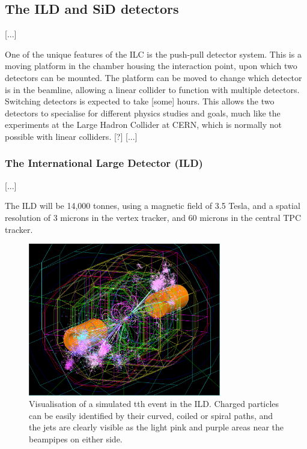 \subsection{The ILD and SiD detectors}
[...]

One of the unique features of the ILC is the push-pull detector system. This is a moving platform in the chamber housing the interaction point, upon which two detectors can be mounted. The platform can be moved to change which detector is in the beamline, allowing a linear collider to function with multiple detectors. Switching detectors is expected to take [some] hours. This allows the two detectors to specialise for different physics studies and goals, much like the experiments at the Large Hadron Collider at CERN, which is normally not possible with linear colliders. [?] [...]

\subsubsection{The International Large Detector (ILD)}
[...]

The ILD will be 14,000 tonnes, using a magnetic field of 3.5 Tesla, and a spatial resolution of 3 microns in the vertex tracker, and 60 microns in the central TPC tracker. 

\begin{figure}[h]
	\centering
	\includegraphics[width=0.75\textwidth]{../Pictures/SimulatedEvent1.png}
	\caption{Visualisation of a simulated tth event in the ILD. Charged particles can be easily identified by their curved, coiled or spiral paths, and the jets are clearly visible as the light pink and purple areas near the beampipes on either side.}
	\label{figure:colliders/ILD/tth-simulation}
\end{figure}

